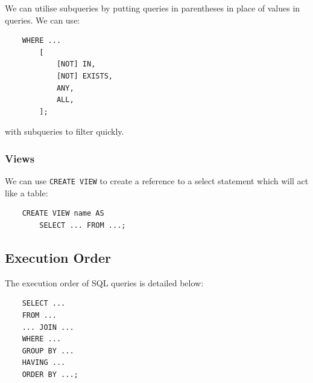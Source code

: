 We can utilise subqueries by putting queries in
parentheses in place of values in queries. We can
use: \begin{lstlisting}
    WHERE ...
        [
            [NOT] IN,
            [NOT] EXISTS,
            ANY,
            ALL,
        ];
\end{lstlisting} with subqueries to filter quickly.

\subsubsection{Views}

We can use \texttt{CREATE VIEW} to create a reference to a select statement
which will act like a table: \begin{lstlisting}
    CREATE VIEW name AS
        SELECT ... FROM ...;
\end{lstlisting}

\subsection{Execution Order}

The execution order of SQL queries is detailed below:
\begin{lstlisting}
    SELECT ...
    FROM ...
    ... JOIN ... 
    WHERE ...
    GROUP BY ...
    HAVING ...
    ORDER BY ...;
\end{lstlisting}
